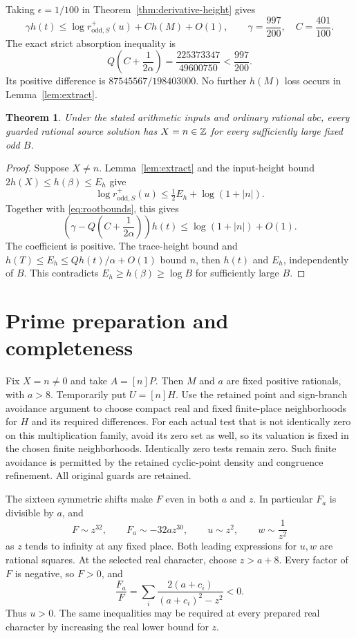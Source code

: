 \documentclass[11pt,a4paper]{article}
\newtheorem{theorem}{Theorem}[section]
\begin{document}
Taking $\epsilon=1/100$ in Theorem~\ref{thm:derivative-height} gives
\[
 \gamma h(t)\le\log r^+_{\mathrm{odd},S}(u)+C h(M)+O(1),\qquad
             \gamma=\frac{997}{200},\quad C=\frac{401}{100}.
\]
The exact strict absorption inequality is
\begin{equation}\label{eq:strict}
 Q\left(C+\frac1{2\alpha}\right)
       =\frac{225373347}{49600750}<\frac{997}{200}.
\end{equation}
Its positive difference is $87545567/198403000$.
No further $h(M)$ loss occurs in Lemma~\ref{lem:extract}.

\begin{theorem}\label{thm:sound}
Under the stated arithmetic inputs and ordinary rational $abc$,
every guarded rational source solution has $X=n\in\mathbb Z$ for every
sufficiently large fixed odd $B$.
\end{theorem}
\begin{proof}
Suppose $X\ne n$. Lemma~\ref{lem:extract} and the input-height bound
$2h(X)\le h(\beta)\le E_h$ give
\[
 \log r^+_{\mathrm{odd},S}(u)
           \le\tfrac12 E_h+\log(1+|n|).
\]
Together with \eqref{eq:rootbounds}, this gives
\[
 \left(\gamma-Q\left(C+\frac1{2\alpha}\right)\right)h(t)
                          \le\log(1+|n|)+O(1).
\]
The coefficient is positive. The trace-height bound and
$h(T)\le E_h\le Qh(t)/\alpha+O(1)$ bound $n$, then $h(t)$ and
$E_h$, independently of $B$. This contradicts
$E_h\ge h(\beta)\ge\log B$ for sufficiently large $B$.
\end{proof}

\section{Prime preparation and completeness}

Fix $X=n\ne0$ and take $A=[n]P$. Then $M$ and $a$ are fixed positive
rationals, with $a>8$. Temporarily put $U=[n]H$. Use the retained
point and sign-branch avoidance argument to choose compact real and
fixed finite-place neighborhoods for $H$ and its required differences.
For each actual test that is not identically zero on this multiplication
family, avoid its zero set as well, so its valuation is fixed in the
chosen finite neighborhoods. Identically zero tests remain zero.
Such finite avoidance is permitted by the retained cyclic-point density
and congruence refinement. All original guards are retained.

The sixteen symmetric shifts make $F$ even in both $a$ and $z$.
In particular $F_a$ is divisible by $a$, and
\begin{equation}\label{eq:asymptotics}
 F\sim z^{32},\qquad F_a\sim-32a z^{30},\qquad
 u\sim z^2,\qquad w\sim\frac1{z^2}
\end{equation}
as $z$ tends to infinity at any fixed place.
Both leading expressions for $u,w$ are rational squares.
At the selected real character, choose $z>a+8$.
Every factor of $F$ is negative, so $F>0$, and
\[
 \frac{F_a}{F}=\sum_i\frac{2(a+c_i)}{(a+c_i)^2-z^2}<0.
\]
Thus $u>0$. The same inequalities may be required at every prepared
real character by increasing the real lower bound for $z$.
\end{document}
